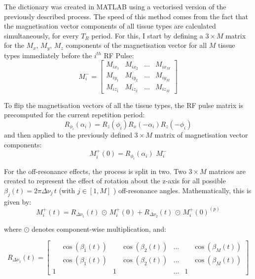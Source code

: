 The dictionary was created in MATLAB using a vectorised version of the previously described process.
The speed of this method comes from the fact that the magnetisation vector components of all tissue types are calculated simultaneously, for every $T_R$ period.
For this, I start by defining a $3 \times M$ matrix for the $M_x, \, M_y, \, M_z$ components of the magnetisation vector for all $M$ tissue types immediately before the $i^{th}$ RF Pulse:
\begin{equation}
    M^{-}_i = 
    \begin{bmatrix}
        M_{ix_1} & M_{ix_2} & \dots & M_{ix_M} \\
        M_{iy_1} & M_{iy_2} & \dots & M_{iy_M} \\
        M_{iz_1} & M_{iz_2} & \dots & M_{iz_M}
    \end{bmatrix}
\end{equation}

To flip the magnetisation vectors of all the tissue types, the RF pulse matrix is precomputed for the current repetition period:
\begin{equation}
        R_{\phi_i}(\alpha_i) = R_{z}(\phi_i) R_{x}(-\alpha_i) R_{z}(-\phi_i)
\end{equation}
and then applied to the previously defined $3 \times M$ matrix of magnetisation vector components:
\begin{equation}
    M^{+}_i(0) = R_{\phi_i}(\alpha_i) \, \, M^{-}_i
\end{equation}

For the off-resonance effects, the process is split in two.
Two $3 \times M$ matrices are created to represent the effect of rotation about the z-axis for all possible $\beta_j(t) = 2\pi \Delta \nu_j \, t$ \big(with $j \in [1, M]$ \big) off-resonance angles.
Mathematically, this is given by:
\begin{equation}
    M^{+}_i (t) = R_{\Delta \nu_1}(t) \, \odot \, M^{+}_i(0) + R_{\Delta \nu_2}(t)  \, \odot \, M^{+}_i(0)^{(p)}
\end{equation}

where $\odot$ denotes component-wise multiplication, and:

\begin{equation}
    R_{\Delta \nu_1}(t)  = \begin{bmatrix} \phantom{-}\cos(\beta_{1}(t) ) & \phantom{-}\cos(\beta_{2}(t) ) & \dots & \phantom{-}\cos(\beta_{M}(t) ) \\
    \phantom{-}\cos(\beta_{1}(t) ) & \phantom{-}\cos(\beta_{2}(t) ) & \dots & \phantom{-}\cos(\beta_{M}(t) ) \\
    1    &        1   & \dots &  1
    \end{bmatrix}
\end{equation}

